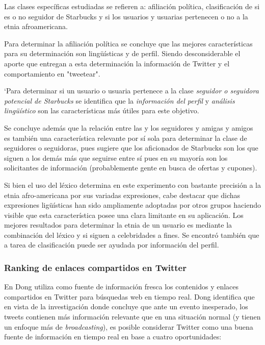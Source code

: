     Las clases específicas estudiadas se refieren a: afiliación política, clasificación de si es o no seguidor de Starbucks y si los usuarios  y usuarias pertenecen o no a la etnia afroamericana. 
    

    Para determinar la afiliación política se concluye que las mejores características para su determinación son
    lingüísticas y de perfil. Siendo desconsiderable el aporte que entregan a esta determinación la información de Twitter y el comportamiento en "tweetear".

    `Para determinar si un usuario o usuaria pertenece a la clase \emph{seguidor o seguidora potencial de Starbucks} se identifica que  la \emph{información del perfil} y \emph{análisis lingüístico} son las  características más útiles para este objetivo.

    Se concluye además que la relación entre las y los seguidores y amigas y amigos es también una característica relevante por sí sola para determinar la clase de seguidores o seguidoras, pues sugiere que los aficionados de Starbucks son los que siguen a los demás más que seguirse entre sí pues en su mayoría son los solicitantes de información (probablemente gente en busca de ofertas y cupones).

    Si bien el uso del léxico determina en este experimento con bastante precisión a la etnia afro-americana por sus variadas expresiones, cabe destacar que dichas expresiones ligüísticas han sido ampliamente adoptadas por otros grupos haciendo visible que esta característica posee una clara limitante en su aplicación. Los mejores resultados para determinar la etnia de un usuario es mediante la combinación del léxico y si siguen a celebridades a fines. Se encontró también que a tarea de clasificación puede ser ayudada por información del perfil.
  
 \subsubsection{Ranking de enlaces compartidos en Twitter}
  
  En \cite{Dong:2010:TEI:1772690.1772725} Dong utiliza como fuente de información fresca los contenidos y enlaces compartidos en Twitter para búsquedas web en tiempo real. Dong identifica que en vista de la investigación \cite{hughes2009twitter} donde concluye que ante un evento inesperado, los tweets contienen más información relevante que en una situación normal (y tienen un enfoque más de \emph{broadcasting}), es posible considerar Twitter como una buena fuente de información en tiempo real en base a cuatro oportunidades:
  
